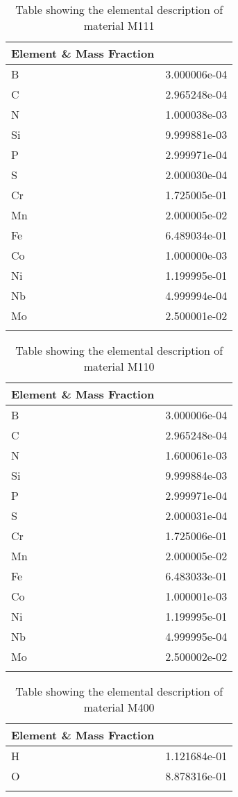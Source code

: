 \begin{centering}
\begin{longtable}[ht!]
{ p{} | p{} }
\hline
Element \& Mass Fraction\\
\hline
B &  3.000006e-04\\
C &  2.965248e-04\\
N &  1.000038e-03\\
Si &  9.999881e-03\\
P &  2.999971e-04\\
S &  2.000030e-04\\
Cr &  1.725005e-01\\
Mn &  2.000005e-02\\
Fe &  6.489034e-01\\
Co &  1.000000e-03\\
Ni &  1.199995e-01\\
Nb &  4.999994e-04\\
Mo &  2.500001e-02\\
\caption{Table showing the elemental description of material M111}
\label{table:material_M111}
\end{longtable}
\clearpage


\begin{longtable}[ht!]
  { p{} | p{} }
\hline
Element \& Mass Fraction\\
\hline
B &  3.000006e-04\\
C &  2.965248e-04\\
N &  1.600061e-03\\
Si &  9.999884e-03\\
P &  2.999971e-04\\
S &  2.000031e-04\\
Cr &  1.725006e-01\\
Mn &  2.000005e-02\\
Fe &  6.483033e-01\\
Co &  1.000001e-03\\
Ni &  1.199995e-01\\
Nb &  4.999995e-04\\
Mo &  2.500002e-02\\
\caption{Table showing the elemental description of material M110}
\label{table:material_M110}
\end{longtable}
\clearpage

\begin{longtable}[ht!]
  { p{} | p{} }
\hline
Element \& Mass Fraction\\
\hline
H &  1.121684e-01\\
O &  8.878316e-01\\
\caption{Table showing the elemental description of material M400}
\label{table:material_M400}
\end{longtable}
\clearpage


\end{centering}
